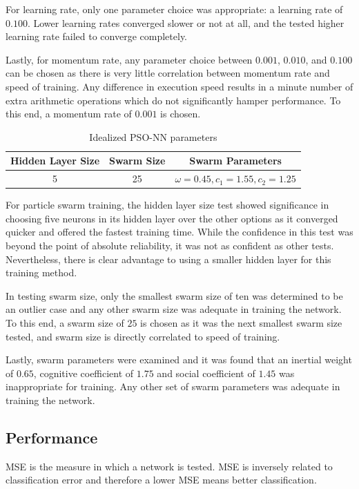 \documentclass[a4paper,12pt]{article}
\begin{document}
For learning rate, only one parameter choice was appropriate: a learning rate of $0.100$. Lower learning rates converged slower or not at all, and the tested higher learning rate failed to converge completely.

Lastly, for momentum rate, any parameter choice between $0.001$, $0.010$, and $0.100$ can be chosen as there is very little correlation between momentum rate and speed of training. Any difference in execution speed results in a minute number of extra arithmetic operations which do not significantly hamper performance. To this end, a momentum rate of $0.001$ is chosen.

\begin{table}[h!]
\centering
\begin{tabular}{|c|c|c|}
\hline
\textbf{Hidden Layer Size} & \textbf{Swarm Size} & \textbf{Swarm Parameters} \\ \hline
5 & 25 & $\omega = 0.45, c_1 = 1.55, c_2 = 1.25$ \\ \hline
\end{tabular}
\caption{Idealized PSO-NN parameters}
\label{Tab:pso-nn-ideal}
\end{table}

For particle swarm training, the hidden layer size test showed significance in choosing five neurons in its hidden layer over the other options as it converged quicker and offered the fastest training time. While the confidence in this test was beyond the point of absolute reliability, it was not as confident as other tests. Nevertheless, there is clear advantage to using a smaller hidden layer for this training method.

In testing swarm size, only the smallest swarm size of ten was determined to be an outlier case and any other swarm size was adequate in training the network. To this end, a swarm size of $25$ is chosen as it was the next smallest swarm size tested, and swarm size is directly correlated to speed of training.

Lastly, swarm parameters were examined and it was found that an inertial weight of $0.65$, cognitive coefficient of $1.75$ and social coefficient of $1.45$ was inappropriate for training. Any other set of swarm parameters was adequate in training the network.

\subsection{Performance}

MSE is the measure in which a network is tested. MSE is inversely related to classification error and therefore a lower MSE means better classification.
\end{document}
